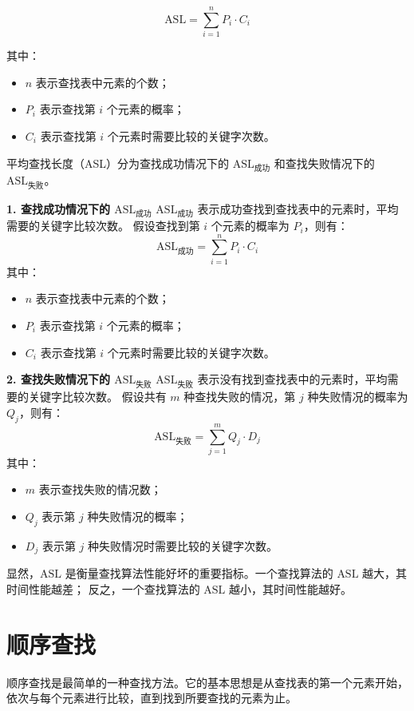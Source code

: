 \documentclass[lang=cn,newtx,10pt,scheme=chinese]{../elegantbook}
\begin{document}
\[
\text{ASL} = \sum_{i=1}^n P_i \cdot C_i
\]

其中：
\begin{itemize}
  \item $n$ 表示查找表中元素的个数；
  \item $P_i$ 表示查找第 $i$ 个元素的概率；
  \item $C_i$ 表示查找第 $i$ 个元素时需要比较的关键字次数。
\end{itemize}

平均查找长度（ASL）分为查找成功情况下的 $\text{ASL}_{\text{成功}}$ 和查找失败情况下的 $\text{ASL}_{\text{失败}}$。

\textbf{1. 查找成功情况下的 $\text{ASL}_{\text{成功}}$}  
$\text{ASL}_{\text{成功}}$ 表示成功查找到查找表中的元素时，平均需要的关键字比较次数。  
假设查找到第 $i$ 个元素的概率为 $P_i$，则有：
\[
\text{ASL}_{\text{成功}} = \sum_{i=1}^n P_i \cdot C_i
\]
其中：
\begin{itemize}
  \item $n$ 表示查找表中元素的个数；
  \item $P_i$ 表示查找第 $i$ 个元素的概率；
  \item $C_i$ 表示查找第 $i$ 个元素时需要比较的关键字次数。
\end{itemize}

\textbf{2. 查找失败情况下的 $\text{ASL}_{\text{失败}}$}  
$\text{ASL}_{\text{失败}}$ 表示没有找到查找表中的元素时，平均需要的关键字比较次数。  
假设共有 $m$ 种查找失败的情况，第 $j$ 种失败情况的概率为 $Q_j$，则有：
\[
\text{ASL}_{\text{失败}} = \sum_{j=1}^m Q_j \cdot D_j
\]
其中：
\begin{itemize}
  \item $m$ 表示查找失败的情况数；
  \item $Q_j$ 表示第 $j$ 种失败情况的概率；
  \item $D_j$ 表示第 $j$ 种失败情况时需要比较的关键字次数。
\end{itemize}

显然，$\text{ASL}$ 是衡量查找算法性能好坏的重要指标。一个查找算法的 $\text{ASL}$ 越大，其时间性能越差；
反之，一个查找算法的 $\text{ASL}$ 越小，其时间性能越好。


\section{顺序查找}

顺序查找是最简单的一种查找方法。它的基本思想是从查找表的第一个元素开始，依次与每个元素进行比较，直到找到所要查找的元素为止。
\end{document}
